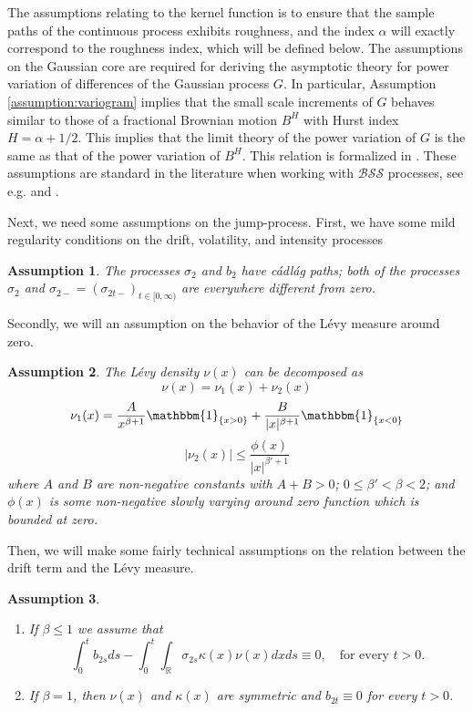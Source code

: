 \documentclass[fleqn,11pt,letterpaper]{article}
\theoremstyle{plain}
\newtheorem{assumption}{Assumption}[section]
\theoremstyle{definition}
\theoremstyle{remark}
\numberwithin{equation}{section}
\begin{document}
The assumptions relating to the kernel function is to ensure that the sample paths of the continuous process exhibits roughness, and the index $\alpha$ will exactly correspond to the roughness index, which will be defined below. The assumptions on the Gaussian core are required for deriving the asymptotic theory for power variation of differences of the Gaussian process $G$. In particular, Assumption \ref{assumption:variogram} implies that the small scale increments of $G$ behaves similar to those of a fractional Brownian motion $B^H$ with Hurst index $H=\alpha+1/2$. This implies that the limit theory of the power variation of $G$ is the same as that of the power variation of $B^H$. This relation is formalized in \cite{Corcuera2013}. These assumptions are standard in the literature when working with $\mathcal{BSS}$ processes, see e.g. \cite{Corcuera2013} and \cite{ole_jose_mark13}.

Next, we need some assumptions on the jump-process. First, we have some mild regularity conditions on the drift, volatility, and intensity processes
\begin{assumption}\label{assumption:levy_regularity}
The processes $\sigma_{2}$ and $b_{2}$ have cádlág paths; both of the processes $\sigma_{2}$ and $\sigma_{2-}=(\sigma_{2t-})_{t\in[0,\infty)}$  are everywhere different from zero. 
\end{assumption}

Secondly, we will an assumption on the behavior of the Lévy measure around zero. 
\begin{assumption}\label{assumption:levy_measure}
The Lévy density $\nu(x)$ can be decomposed as 
\begin{equation}
    \nu(x)=\nu_1(x) + \nu_2(x)
\end{equation}
\begin{equation}
    \nu_1(x) = \frac{A}{x^{\beta+1}} \mathbbm{1}_{\{x>0\}} + \frac{B}{\vert x\vert^{\beta+1}} \mathbbm{1}_{\{x<0\}}
\end{equation}
\begin{equation}
    \vert\nu_2(x)\vert\leq\frac{\phi(x)}{\vert x\vert^{\beta'+1}}
\end{equation}
where $A$ and $B$ are non-negative constants with $A+B>0$; $0\leq \beta' < \beta < 2$; and $\phi(x)$ is some non-negative slowly varying around zero function which is bounded at zero. 
\end{assumption}
Then, we will make some fairly technical assumptions on the relation between the drift term and the Lévy measure. 
\begin{assumption}\label{assumption:levy_drift}
    \begin{enumerate}
        \item If $\beta\leq1$ we assume that
    \begin{equation}
        \int_0^tb_{2s}ds-\int_0^t\int_\mathbb{R}\sigma_{2s}\kappa(x)\nu(x)dxds\equiv0,\quad\text{for every }t>0.
    \end{equation} 
    \item If $\beta=1$, then $\nu(x)$ and $\kappa(x)$ are symmetric and $b_{2t}\equiv0$ for every $t>0$. 
    \end{enumerate}
\end{assumption}
\end{document}
